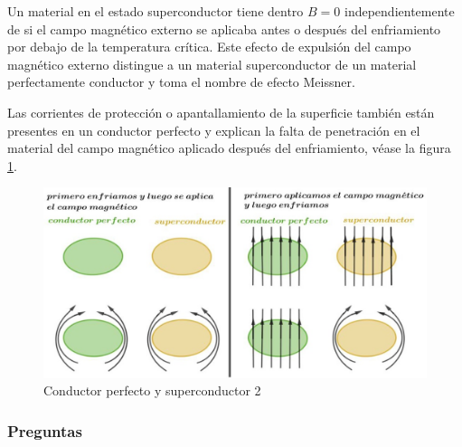 Un material en el estado superconductor tiene dentro $B=0$ independientemente de si el campo magnético externo se aplicaba antes o después del enfriamiento por debajo de la temperatura crítica. Este efecto de expulsión del campo magnético externo distingue a un material superconductor de un material perfectamente conductor y toma el nombre de efecto Meissner.

Las corrientes de protección o apantallamiento de la superficie también están presentes en un conductor perfecto y explican la falta de penetración en el material del campo magnético aplicado después del enfriamiento, véase la figura \ref{fig:417}. 

\begin{figure}[H]
    \centering
    \includegraphics[width=1.0\textwidth]{./Figures/fig417}
    \caption{Conductor perfecto y superconductor 2}
	\label{fig:417}
\end{figure}

\subsubsection{Preguntas}

